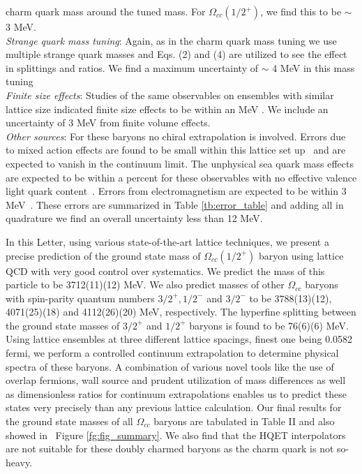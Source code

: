 \documentclass[showkeys,aps,twocolumn,showpacs,preprintnumbers,amsmath,amssymb,prl,letterpaper,floatfix,nofootinbib,superscriptaddress,]{revtex4-1}
\newcommand\fgn[1]{Figure \ref{fg:#1}}
\newcommand\tbn[1]{Table \ref{tb:#1}}
\begin{document}
{{charm quark mass around the tuned mass. For $\Omega_{cc}(1/2^{+})$, we find this to be $\sim$ 3 MeV. \\
{\it Strange quark mass tuning}: Again, as in the charm quark mass tuning we use multiple strange quark masses and Eqs. (2) and (4) are utilized to see the effect in splittings and ratios. We find a maximum uncertainty of $\sim$ 4 MeV in this mass tuning \\
{\it Finite size effects}: Studies of the same observables on ensembles with similar lattice size indicated finite 
size effects to be within an MeV \cite{Brown:2014ena}. We include an uncertainty of 3 MeV from finite volume effects.\\
{\it Other sources}: For these baryons no chiral extrapolation is involved. Errors due to mixed action effects are found to be small within this lattice set up~\cite{Basak:2014kma}
and are expected to vanish in the continuum limit. The unphysical sea quark mass effects are expected to be within 
a percent for these observables with no effective valence light quark content~\cite{McNeile:2012qf, Dowdall:2012ab, Chakraborty:2014aca}. Errors from electromagnetism are expected  to be within 3 MeV~\cite{Borsanyi:2014jba}. These errors are summarized in \tbn{error_table} and adding all in quadrature we find an overall uncertainty less than 12 MeV.




 In this Letter, using various state-of-the-art lattice techniques, we present a precise prediction of the ground state mass of $\Omega_{cc}(1/2^{+})$ baryon using lattice QCD with very good control over systematics. We predict the mass of this particle to be 3712(11)(12) MeV. We also predict masses of other $\Omega_{cc}$ baryons with spin-parity quantum numbers $3/2^{+}, 1/2^{-}$ and $3/2^{-}$ to be 3788(13)(12), 4071(25)(18) and 4112(26)(20) MeV, respectively. The hyperfine splitting between the ground state masses of  $3/2^{+}$ and $1/2^{+}$ baryons is found to be 76(6)(6) MeV. Using lattice ensembles at three different lattice spacings, finest one being 0.0582 fermi, we perform a 
controlled continuum extrapolation to determine physical spectra of these baryons. 
A combination of various novel tools like the use of overlap fermions, wall source and prudent utilization of mass differences as well as dimensionless ratios for continuum extrapolations enables us to predict these states very precisely than any previous lattice calculation. Our 
final results for the ground state masses of all $\Omega_{cc}$ baryons are tabulated in Table II and 
also showed in ~\fgn{fig_summary}. We also find that the HQET interpolators are not suitable for these doubly charmed baryons as the charm quark is not so-heavy.


}}
\end{document}
